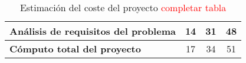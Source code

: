 \begin{table}[h]
{\begin{tabular}{lccc}
Análisis de requisitos del problema                                                           & 14                                                       & 31                                                           & 48                                                            \\ \hline
\textbf{Cómputo total del proyecto}                                                           & 17                                                       & 34                                                           & 51                                                            \\ \hline
\end{tabular}
}
\caption{Estimación del coste del proyecto \textcolor{red}{completar tabla}}
\label{tab:estcostes}
\end{table}